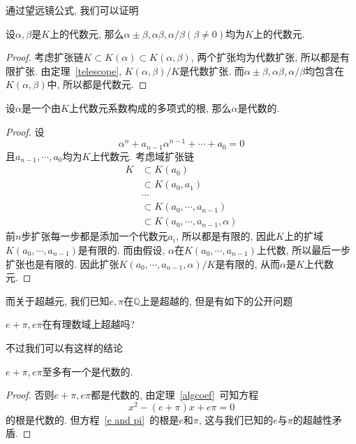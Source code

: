 通过望远镜公式, 我们可以证明
\begin{thm}
    设$\alpha,\beta$是$K$上的代数元, 那么$\alpha\pm\beta,\alpha\beta,\alpha/\beta(\beta\neq 0)$均为$K$上的代数元.
\end{thm}
\begin{proof}
    考虑扩张链$K\subset K(\alpha)\subset K(\alpha,\beta)$, 两个扩张均为代数扩张, 所以都是有限扩张.
    由定理~\ref{telescope}, $K(\alpha,\beta)/K$是代数扩张.
    而$\alpha\pm\beta,\alpha\beta,\alpha/\beta$均包含在$K(\alpha,\beta)$中, 所以都是代数元.
\end{proof}

\begin{thm}\label{algcoef}
    设$\alpha$是一个由$K$上代数元系数构成的多项式的根, 那么$\alpha$是代数的.
\end{thm}
\begin{proof}
    设
    \[\alpha^n+a_{n-1}\alpha^{n-1}+\cdots+a_0=0\]
    且$a_{n-1},\cdots,a_0$均为$K$上代数元.
    考虑域扩张链
    \begin{align*}
        K&\subset K(a_0)\\
        &\subset K(a_0,a_1)\\
        &\cdots\\
        &\subset K(a_0,\cdots,a_{n-1})\\
        &\subset K(a_0,\cdots,a_{n-1},\alpha)
    \end{align*}
    前$n$步扩张每一步都是添加一个代数元$a_i$, 所以都是有限的, 因此$K$上的扩域$K(a_0,\cdots,a_{n-1})$是有限的.
    而由假设, $\alpha$在$K(a_0,\cdots,a_{n-1})$上代数, 所以最后一步扩张也是有限的.
    因此扩张$K(a_0,\cdots,a_{n-1},\alpha)/K$是有限的, 从而$\alpha$是$K$上代数元.
\end{proof}

而关于超越元, 我们已知$e,\pi$在$\mathbb{Q}$上是超越的, 但是有如下的公开问题
\begin{pro}
    $e+\pi,e\pi$在有理数域上超越吗?
\end{pro}

不过我们可以有这样的结论
\begin{prop}
    $e+\pi,e\pi$至多有一个是代数的.
\end{prop}
\begin{proof}
    否则$e+\pi,e\pi$都是代数的, 由定理~\ref{algcoef}~可知方程
    \begin{equation}
        x^2-(e+\pi)x+e\pi=0\label{e and pi}
    \end{equation}
    的根是代数的.
    但方程~\eqref{e and pi}~的根是$e$和$\pi$, 这与我们已知的$e$与$\pi$的超越性矛盾.
\end{proof}
